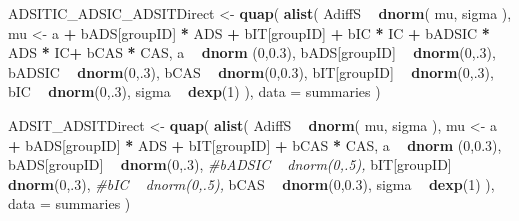 \documentclass[10pt,dvipsnames,enabledeprecatedfontcommands]{scrartcl}
\newenvironment{Shaded}{\begin{snugshade}}{\end{snugshade}}
\newcommand{\KeywordTok}[1]{\textcolor[rgb]{0.13,0.29,0.53}{\textbf{#1}}}
\newcommand{\DataTypeTok}[1]{\textcolor[rgb]{0.13,0.29,0.53}{#1}}
\newcommand{\DecValTok}[1]{\textcolor[rgb]{0.00,0.00,0.81}{#1}}
\newcommand{\FloatTok}[1]{\textcolor[rgb]{0.00,0.00,0.81}{#1}}
\newcommand{\StringTok}[1]{\textcolor[rgb]{0.31,0.60,0.02}{#1}}
\newcommand{\CommentTok}[1]{\textcolor[rgb]{0.56,0.35,0.01}{\textit{#1}}}
\newcommand{\OperatorTok}[1]{\textcolor[rgb]{0.81,0.36,0.00}{\textbf{#1}}}
\newcommand{\NormalTok}[1]{#1}
\begin{document}
\begin{Shaded}
\begin{Highlighting}[]
\NormalTok{ADSITIC_ADSIC_ADSITDirect <-}\StringTok{ }\KeywordTok{quap}\NormalTok{(}
  \KeywordTok{alist}\NormalTok{(}
\NormalTok{    AdiffS }\OperatorTok{~}\StringTok{ }\KeywordTok{dnorm}\NormalTok{( mu, sigma ),}
\NormalTok{    mu <-}\StringTok{ }\NormalTok{a }\OperatorTok{+}\StringTok{ }\NormalTok{bADS[groupID] }\OperatorTok{*}\StringTok{ }\NormalTok{ADS }\OperatorTok{+}\StringTok{  }\NormalTok{bIT[groupID] }\OperatorTok{+}\StringTok{ }\NormalTok{bIC }\OperatorTok{*}\StringTok{ }\NormalTok{IC }\OperatorTok{+}\StringTok{ }\NormalTok{bADSIC }\OperatorTok{*}\StringTok{ }\NormalTok{ADS }\OperatorTok{*}\StringTok{ }\NormalTok{IC}\OperatorTok{+}\StringTok{ }\NormalTok{bCAS }\OperatorTok{*}\StringTok{ }\NormalTok{CAS,}
\NormalTok{    a }\OperatorTok{~}\StringTok{ }\KeywordTok{dnorm}\NormalTok{ (}\DecValTok{0}\NormalTok{,}\FloatTok{0.3}\NormalTok{),}
\NormalTok{    bADS[groupID] }\OperatorTok{~}\StringTok{ }\KeywordTok{dnorm}\NormalTok{(}\DecValTok{0}\NormalTok{,.}\DecValTok{3}\NormalTok{),}
\NormalTok{    bADSIC }\OperatorTok{~}\StringTok{ }\KeywordTok{dnorm}\NormalTok{(}\DecValTok{0}\NormalTok{,.}\DecValTok{3}\NormalTok{),}
\NormalTok{    bCAS }\OperatorTok{~}\StringTok{ }\KeywordTok{dnorm}\NormalTok{(}\DecValTok{0}\NormalTok{,}\FloatTok{0.3}\NormalTok{),}
\NormalTok{    bIT[groupID] }\OperatorTok{~}\StringTok{ }\KeywordTok{dnorm}\NormalTok{(}\DecValTok{0}\NormalTok{,.}\DecValTok{3}\NormalTok{),}
\NormalTok{    bIC }\OperatorTok{~}\StringTok{ }\KeywordTok{dnorm}\NormalTok{(}\DecValTok{0}\NormalTok{,.}\DecValTok{3}\NormalTok{),}
\NormalTok{    sigma  }\OperatorTok{~}\StringTok{ }\KeywordTok{dexp}\NormalTok{(}\DecValTok{1}\NormalTok{)}
\NormalTok{  ), }
  \DataTypeTok{data =}\NormalTok{ summaries}
\NormalTok{)}


\NormalTok{ADSIT_ADSITDirect <-}\StringTok{ }\KeywordTok{quap}\NormalTok{(}
  \KeywordTok{alist}\NormalTok{(}
\NormalTok{    AdiffS }\OperatorTok{~}\StringTok{ }\KeywordTok{dnorm}\NormalTok{( mu, sigma ),}
\NormalTok{    mu <-}\StringTok{ }\NormalTok{a }\OperatorTok{+}\StringTok{ }\NormalTok{bADS[groupID] }\OperatorTok{*}\StringTok{ }\NormalTok{ADS }\OperatorTok{+}\StringTok{  }\NormalTok{bIT[groupID] }\OperatorTok{+}\StringTok{ }\NormalTok{bCAS }\OperatorTok{*}\StringTok{ }\NormalTok{CAS,}
\NormalTok{    a }\OperatorTok{~}\StringTok{ }\KeywordTok{dnorm}\NormalTok{ (}\DecValTok{0}\NormalTok{,}\FloatTok{0.3}\NormalTok{),}
\NormalTok{    bADS[groupID] }\OperatorTok{~}\StringTok{ }\KeywordTok{dnorm}\NormalTok{(}\DecValTok{0}\NormalTok{,.}\DecValTok{3}\NormalTok{),}
    \CommentTok{#bADSIC ~ dnorm(0,.5),}
\NormalTok{    bIT[groupID] }\OperatorTok{~}\StringTok{ }\KeywordTok{dnorm}\NormalTok{(}\DecValTok{0}\NormalTok{,.}\DecValTok{3}\NormalTok{),}
    \CommentTok{#bIC ~ dnorm(0,.5),}
\NormalTok{    bCAS }\OperatorTok{~}\StringTok{ }\KeywordTok{dnorm}\NormalTok{(}\DecValTok{0}\NormalTok{,}\FloatTok{0.3}\NormalTok{),}
\NormalTok{    sigma  }\OperatorTok{~}\StringTok{ }\KeywordTok{dexp}\NormalTok{(}\DecValTok{1}\NormalTok{)}
\NormalTok{  ), }
  \DataTypeTok{data =}\NormalTok{ summaries}
\NormalTok{)}



\end{Highlighting}
\end{Shaded}
\end{document}
